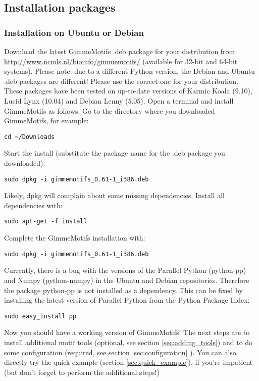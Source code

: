 \documentclass[11pt]{article}
\begin{document}
\subsection{Installation packages}
\subsubsection{Installation on Ubuntu or Debian}
Download the latest GimmeMotifs .deb package for your distribution  from \url{http://www.ncmls.nl/bioinfo/gimmemotifs/} (available for 32-bit and 64-bit systems). Please note: due to a different Python version, the Debian and Ubuntu .deb packages are different! Please use the correct one for your distribution.
These packages have been tested on up-to-date versions of Karmic Koala (9.10), Lucid Lynx (10.04) and Debian Lenny (5.05). 
Open a terminal and install GimmeMotifs as follows. Go to the directory where you downloaded GimmeMotifs, for example:
\begin{verbatim}
cd ~/Downloads
\end{verbatim}
Start the install (substitute the package name for the .deb package you downloaded):
\begin{verbatim}
sudo dpkg -i gimmemotifs_0.61-1_i386.deb 
\end{verbatim}
Likely, dpkg will complain about some missing dependencies. Install all dependencies with:
\begin{verbatim}
sudo apt-get -f install
\end{verbatim}
Complete the GimmeMotifs installation with:
\begin{verbatim}
sudo dpkg -i gimmemotifs_0.61-1_i386.deb 
\end{verbatim}
Currently, there is a bug with the versions of the Parallel Python (python-pp) and Numpy (python-numpy) in the Ubuntu and Debian repositories. Therefore the package python-pp is not installed as a dependency. This can be fixed by installing the latest version of Parallel Python from the Python Package Index:
\begin{verbatim}
sudo easy_install pp 
\end{verbatim}
Now you should have a working version of GimmeMotifs! The next steps are to install additional motif tools (optional, see section \ref{sec:adding_tools}) and to do some configuration (required, see section \ref{sec:configuration} ). You can also directly try the quick example (section \ref{sec:quick_example}), if you're impatient (but don't forget to perform the additional steps!)
\end{document}
